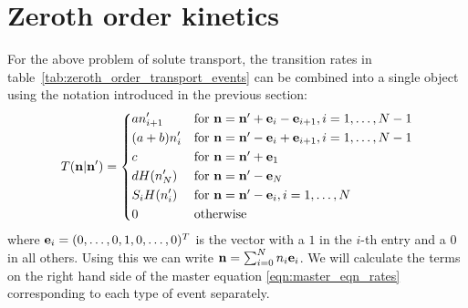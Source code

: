 \section{Zeroth order kinetics}
For the above problem of solute transport, the transition rates in
table~\ref{tab:zeroth_order_transport_events} can be combined into a single object using the
notation introduced in the previous section:
\begin{equation}
    \label{eqn:transition_rates_zeroth_order}
    T(\V{n}|\V{n}') =%
        \begin{dcases*}
            a n'_{i+1} & for \(\V{n} = \V{n}' + \V{e}_i - \V{e}_{i+1},
            i=1,\dotsc,N-1\)\\
            (a+b) n'_i & for \(\V{n} = \V{n}' - \V{e}_i + \V{e}_{i+1},
            i=1,\dotsc,N-1\)\\
            c & for \(\V{n} = \V{n}' + \V{e}_1\)\\
            d H(n'_N) & for \(\V{n} = \V{n}' - \V{e}_N\)\\
            S_i H(n'_i) & for \(\V{n} = \V{n}' - \V{e}_i, i=1,\dotsc,N\)\\
            0 & otherwise
        \end{dcases*}
\end{equation}
where \(\mathbf{e}_i = (0,\dotsc,0,1,0,\dotsc,0)^T\) is the vector with a \(1\) in
the \(i\)-th entry and a \(0\) in all others. Using this we can write \(\mathbf{n} =
\sum_{i=0}^{N} n_i \mathbf{e}_i\). We will calculate the terms on the right hand side
of the master equation \eqref{eqn:master_eqn_rates} corresponding to each type
of event separately.

